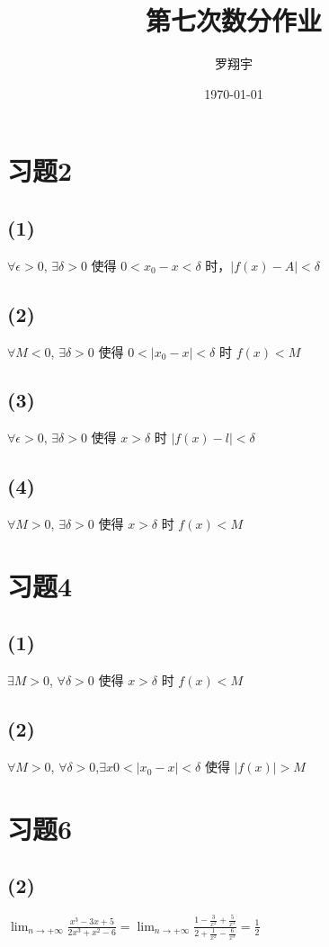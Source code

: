 \documentclass[a4paper,11pt]{article}
\title{第七次数分作业}
\author{罗翔宇}
\date{\today}
\newcommand{\Limit}{\displaystyle \lim_{n \rightarrow +\infty}}
\begin{document}
\maketitle

\section*{习题2}
\subsection*{(1)}
$\forall \epsilon > 0$, $\exists \delta > 0$ 使得 $0 < x_0-x < \delta$ 时，$|f(x) - A| < \delta$
\subsection*{(2)}
$\forall M < 0$, $\exists \delta > 0$ 使得 $0 < |x_0 - x| < \delta$ 时 $f(x) < M$
\subsection*{(3)}
$\forall \epsilon > 0$, $\exists \delta > 0$ 使得 $x > \delta$ 时 $|f(x) - l| < \delta$
\subsection*{(4)}
$\forall M > 0$, $\exists \delta > 0$ 使得 $x > \delta$ 时 $f(x) < M$
\section*{习题4}
\subsection*{(1)}
$\exists M > 0$, $\forall \delta > 0$ 使得 $x > \delta$ 时 $f(x) < M$
\subsection*{(2)}
$\forall M > 0$, $\forall \delta > 0$,$\exists x 0 < |x_0 - x| < \delta$ 使得 $|f(x)| > M$
\section*{习题6}
\subsection*{(2)}
$\Limit \frac{x^3-3x+5}{2x^3+x^2-6} = \Limit \frac{1-\frac{3}{x^2}+\frac{5}{x^3}}{2+\frac{1}{x^2}-\frac{6}{x^3}} = \frac{1}{2}$
\end{document}
